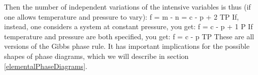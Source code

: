 \documentclass[12pt]{article}
\begin{document}
Then the number of independent variations of the intensive variables is thus (if one allows temperature and pressure to vary): 
\eqs f = m - n = c - p + 2 \text{ (}TP  \eqe
If, instead, one considers a system at constant pressure, you get:
\eqs f = c - p + 1 \text{ (}P  \eqe
If temperature and pressure are both specified, you get:
\eqs f = c - p \text{ (}TP  \eqe
These are all versions of the Gibbs phase rule. It has important implications for the possible shapes of phase diagrams, which we will describe in section \ref{elementalPhaseDiagrams}.




\end{document}
